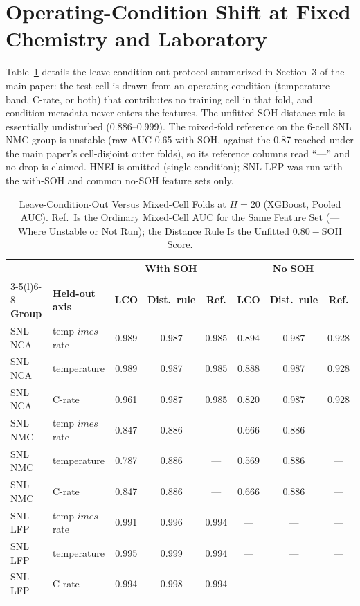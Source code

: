 \documentclass[11pt,a4paper]{article}
\begin{document}
\section{Operating-Condition Shift at Fixed Chemistry and Laboratory}
Table~\ref{tab:s_cond} details the leave-condition-out protocol summarized in Section~3 of the main paper: the test cell is drawn from an operating condition (temperature band, C-rate, or both) that contributes no training cell in that fold, and condition metadata never enters the features. The unfitted SOH distance rule is essentially undisturbed (0.886--0.999). The mixed-fold reference on the 6-cell SNL NMC group is unstable (raw AUC 0.65 with SOH, against the 0.87 reached under the main paper's cell-disjoint outer folds), so its reference columns read ``---'' and no drop is claimed. HNEI is omitted (single condition); SNL LFP was run with the with-SOH and common no-SOH feature sets only.
\begin{table}[!t]
\caption{Leave-Condition-Out Versus Mixed-Cell Folds at $H{=}20$ (XGBoost, Pooled AUC). Ref.\ Is the Ordinary Mixed-Cell AUC for the Same Feature Set (--- Where Unstable or Not Run); the Distance Rule Is the Unfitted $0.80-$SOH Score.}
\label{tab:s_cond}
\centering\footnotesize\setlength{\tabcolsep}{4pt}
\begin{tabular}{llcccccc}
\toprule
 & & \multicolumn{3}{c}{\textbf{With SOH}} & \multicolumn{3}{c}{\textbf{No SOH}}\\
\cmidrule(lr){3-5}\cmidrule(l){6-8}
\textbf{Group} & \textbf{Held-out axis} & \textbf{LCO} & \textbf{Dist.\ rule} & \textbf{Ref.} & \textbf{LCO} & \textbf{Dist.\ rule} & \textbf{Ref.}\\
\midrule
SNL NCA & temp $	imes$ rate & 0.989 & 0.987 & 0.985 & 0.894 & 0.987 & 0.928\\
SNL NCA & temperature & 0.989 & 0.987 & 0.985 & 0.888 & 0.987 & 0.928\\
SNL NCA & C-rate & 0.961 & 0.987 & 0.985 & 0.820 & 0.987 & 0.928\\
SNL NMC & temp $	imes$ rate & 0.847 & 0.886 & --- & 0.666 & 0.886 & ---\\
SNL NMC & temperature & 0.787 & 0.886 & --- & 0.569 & 0.886 & ---\\
SNL NMC & C-rate & 0.847 & 0.886 & --- & 0.666 & 0.886 & ---\\
SNL LFP & temp $	imes$ rate & 0.991 & 0.996 & 0.994 & --- & --- & ---\\
SNL LFP & temperature & 0.995 & 0.999 & 0.994 & --- & --- & ---\\
SNL LFP & C-rate & 0.994 & 0.998 & 0.994 & --- & --- & ---\\
\bottomrule
\end{tabular}
\end{table}
\end{document}

